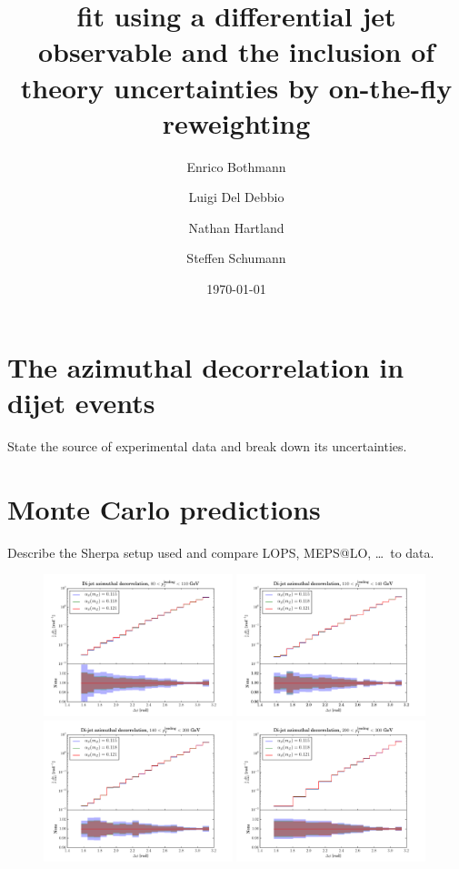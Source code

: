 \documentclass[a4paper]{scrartcl}
\title{\alphas fit using a differential jet observable and the inclusion of
theory uncertainties by on-the-fly reweighting}
\author{Enrico Bothmann \and Luigi Del Debbio \and Nathan Hartland \and Steffen
Schumann}
\date{\today}
\begin{document}
\maketitle
\section{The azimuthal decorrelation in dijet events}
State the source of experimental data and break down its uncertainties.
\cite{Khachatryan:2011zj,Khachatryan:2016hkr}
\section{Monte Carlo predictions}
Describe the Sherpa setup used and compare LOPS, MEPS@LO, \dots\ to data.
\begin{figure}[p]
    \centering
    \includegraphics[width=0.49\textwidth]{d01-x01-y01_PDF-errors}
    \includegraphics[width=0.49\textwidth]{d02-x01-y01_PDF-errors}
    \includegraphics[width=0.49\textwidth]{d03-x01-y01_PDF-errors}
    \includegraphics[width=0.49\textwidth]{d04-x01-y01_PDF-errors}

\end{figure}
\end{document}
